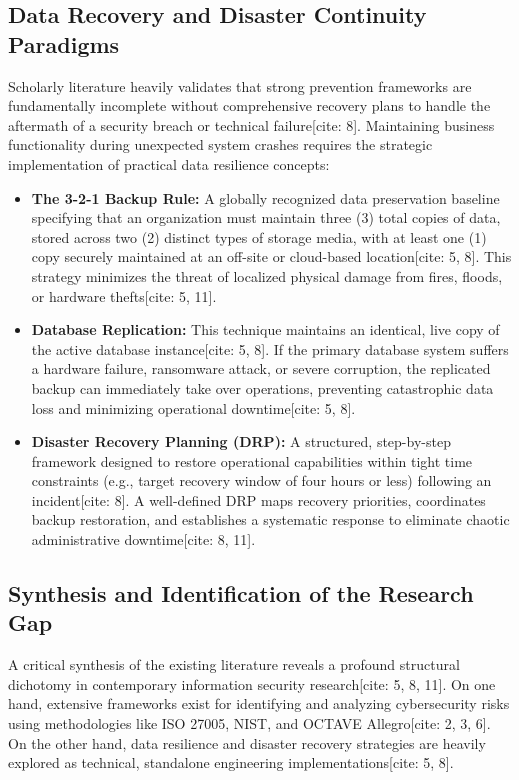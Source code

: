 \documentclass[journal,onecolumn,12pt,twoside]{IEEEtran}
\begin{document}
	\subsection{Data Recovery and Disaster Continuity Paradigms}
	\label{subsec:recovery_paradigms}
	Scholarly literature heavily validates that strong prevention frameworks are fundamentally incomplete without comprehensive recovery plans to handle the aftermath of a security breach or technical failure[cite: 8]. Maintaining business functionality during unexpected system crashes requires the strategic implementation of practical data resilience concepts:
	\begin{itemize}
		\item \textbf{The 3-2-1 Backup Rule:} A globally recognized data preservation baseline specifying that an organization must maintain three (3) total copies of data, stored across two (2) distinct types of storage media, with at least one (1) copy securely maintained at an off-site or cloud-based location[cite: 5, 8]. This strategy minimizes the threat of localized physical damage from fires, floods, or hardware thefts[cite: 5, 11].
		\item \textbf{Database Replication:} This technique maintains an identical, live copy of the active database instance[cite: 5, 8]. If the primary database system suffers a hardware failure, ransomware attack, or severe corruption, the replicated backup can immediately take over operations, preventing catastrophic data loss and minimizing operational downtime[cite: 5, 8].
		\item \textbf{Disaster Recovery Planning (DRP):} A structured, step-by-step framework designed to restore operational capabilities within tight time constraints (e.g., target recovery window of four hours or less) following an incident[cite: 8]. A well-defined DRP maps recovery priorities, coordinates backup restoration, and establishes a systematic response to eliminate chaotic administrative downtime[cite: 8, 11].
	\end{itemize}
	
	\subsection{Synthesis and Identification of the Research Gap}
	\label{subsec:research_gap}
	A critical synthesis of the existing literature reveals a profound structural dichotomy in contemporary information security research[cite: 5, 8, 11]. On one hand, extensive frameworks exist for identifying and analyzing cybersecurity risks using methodologies like ISO 27005, NIST, and OCTAVE Allegro[cite: 2, 3, 6]. On the other hand, data resilience and disaster recovery strategies are heavily explored as technical, standalone engineering implementations[cite: 5, 8]. 
	
\end{document}
